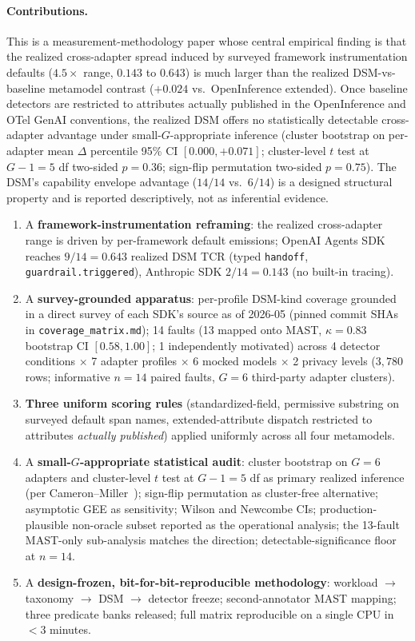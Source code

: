 \documentclass[a4paper,UKenglish,cleveref,autoref,thm-restate]{lipics-v2021}
\begin{document}
\paragraph*{Contributions.}
This is a measurement-methodology paper whose central empirical
finding is that the realized cross-adapter spread induced by
surveyed framework instrumentation defaults ($4.5\times$ range,
$0.143$ to $0.643$) is much larger than the realized DSM-vs-baseline
metamodel contrast ($+0.024$ vs.\ OpenInference extended). Once
baseline detectors are restricted to
attributes actually published in the OpenInference and OTel GenAI
conventions, the realized DSM offers no statistically detectable
cross-adapter advantage under small-$G$-appropriate inference
(cluster bootstrap on per-adapter mean $\Delta$ percentile 95\% CI
$[0.000, +0.071]$; cluster-level $t$ test at $G - 1 = 5$ df two-sided $p = 0.36$;
sign-flip permutation two-sided $p = 0.75$). The DSM's capability
envelope advantage ($14/14$ vs.\ $6/14$) is a designed structural
property and is reported descriptively, not as inferential evidence.
\begin{enumerate}[(C1)]
\item A \textbf{framework-instrumentation reframing}: the realized
  cross-adapter range is driven by per-framework default emissions;
  OpenAI Agents SDK reaches $9/14 = 0.643$ realized DSM
  TCR (typed \texttt{handoff}, \texttt{guardrail.triggered}),
  Anthropic SDK $2/14 = 0.143$ (no built-in tracing).
\item A \textbf{survey-grounded apparatus}: per-profile DSM-kind
  coverage grounded in a direct survey of each SDK's source as of
  2026-05 (pinned commit SHAs in \texttt{coverage\_matrix.md}); 14
  faults (13 mapped onto MAST, $\kappa = 0.83$ bootstrap CI
  $[0.58, 1.00]$; 1 independently motivated) across 4 detector
  conditions $\times$ 7 adapter profiles $\times$ 6 mocked models
  $\times$ 2 privacy levels ($3{,}780$ rows; informative $n = 14$
  paired faults, $G = 6$ third-party adapter clusters).
\item \textbf{Three uniform scoring rules} (standardized-field,
  permissive substring on surveyed default span names,
  extended-attribute dispatch restricted to attributes \emph{actually
  published}) applied uniformly across all four metamodels.
\item A \textbf{small-$G$-appropriate statistical audit}: cluster
  bootstrap on $G = 6$ adapters and cluster-level $t$ test at $G - 1 = 5$ df as
  primary realized inference (per Cameron--Miller~\cite{cameron2015});
  sign-flip permutation as cluster-free alternative; asymptotic
  GEE as sensitivity; Wilson and Newcombe CIs; production-
  plausible non-oracle subset reported as the operational analysis;
  the 13-fault MAST-only sub-analysis matches the direction;
  detectable-significance floor at $n = 14$.
\item A \textbf{design-frozen, bit-for-bit-reproducible methodology}:
  workload $\to$ taxonomy $\to$ DSM $\to$ detector freeze;
  second-annotator MAST mapping; three predicate banks released;
  full matrix reproducible on a single CPU in $<3$ minutes.
\end{enumerate}
\end{document}
